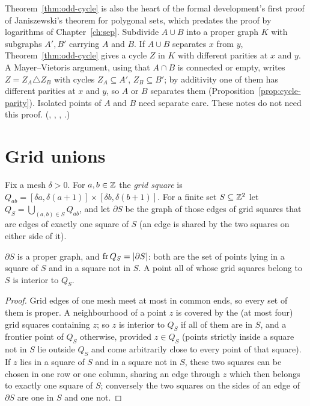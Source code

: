 
\begin{remark}\label{rem:jan-cycles}
Theorem~\ref{thm:odd-cycle} is also the heart of the formal development's first proof of
Janiszewski's theorem for polygonal sets, which predates the proof by logarithms of
Chapter~\ref{ch:sep}. Subdivide $A\cup B$ into a proper graph $K$ with subgraphs $A',B'$ carrying
$A$ and $B$. If $A\cup B$ separates $x$ from $y$, Theorem~\ref{thm:odd-cycle} gives a cycle $Z$ in
$K$ with different parities at $x$ and $y$. A Mayer--Vietoris argument, using that $A\cap B$ is
connected or empty, writes $Z=Z_A\triangle Z_B$ with cycles $Z_A\subseteq A'$, $Z_B\subseteq B'$; by
additivity one of them has different parities at $x$ and $y$, so $A$ or $B$ separates them
(Proposition~\ref{prop:cycle-parity}). Isolated points of $A$ and $B$ need separate care. These
notes do not need this proof. (,
, ,
.)
\end{remark}

\section{Grid unions}

Fix a mesh $\delta>0$. For $a,b\in\mathbb{Z}$ the \emph{grid square} is
$Q_{ab}=[\delta a,\delta(a+1)]\times[\delta b,\delta(b+1)]$. For a finite set $S\subseteq\mathbb{Z}^2$ let
$Q_S=\bigcup_{(a,b)\in S}Q_{ab}$, and let $\partial S$ be the graph of those edges of grid squares
that are edges of exactly one square of $S$ (an edge is shared by the two squares on either side of
it).

\begin{lemma}\label{lem:grid}
$\partial S$ is a proper graph, and $\operatorname{fr}Q_S=\lvert \partial S\rvert$: both are the set of
points lying in a square of $S$ and in a square not in $S$. A point all of whose grid squares
belong to $S$ is interior to $Q_S$.
\end{lemma}

\begin{proof}
Grid edges of one mesh meet at most in common ends, so every set of them is proper. A neighbourhood
of a point $z$ is covered by the (at most four) grid squares containing $z$; so $z$ is interior to
$Q_S$ if all of them are in $S$, and a frontier point of $Q_S$ otherwise, provided $z\in Q_S$ (points
strictly inside a square not in $S$ lie outside $Q_S$ and come arbitrarily close to every point of
that square). If $z$ lies in a square of $S$ and in a square not in $S$, these two squares can be
chosen in one row or one column, sharing an edge through $z$ which then belongs to exactly one
square of $S$; conversely the two squares on the sides of an edge of $\partial S$ are one in $S$ and
one not.
\end{proof}

